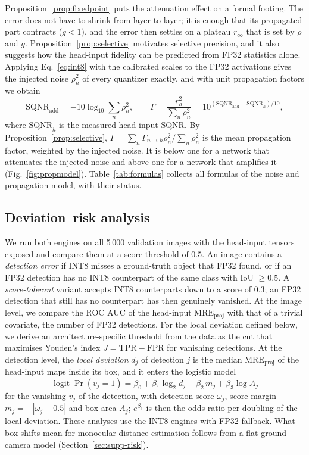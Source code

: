 \documentclass[pdflatex,sn-mathphys-num]{sn-jnl}%
\theoremstyle{thmstyleone}%
\theoremstyle{thmstyletwo}%
\theoremstyle{thmstylethree}%
\begin{document}
Proposition~\ref{prop:fixedpoint} puts the attenuation effect on a formal footing. The error does not have to shrink from layer to layer; it is enough that its propagated part contracts ($g<1$), and the error then settles on a plateau $r_\infty$ that is set by $\rho$ and $g$. Proposition~\ref{prop:selective} motivates selective precision, and it also suggests how the head-input fidelity can be predicted from FP32 statistics alone. Applying Eq.~\eqref{eq:int8} with the calibrated scales to the FP32 activations gives the injected noise $\rho_n^2$ of every quantizer exactly, and with unit propagation factors we obtain
\begin{equation}
\mathrm{SQNR}_\mathrm{add}=-10\log_{10}\sum_n\rho_n^2,\qquad\bar\Gamma=\frac{r_h^2}{\sum_n\rho_n^2}=10^{(\mathrm{SQNR}_\mathrm{add}-\mathrm{SQNR}_h)/10},\label{eq:gammabar}
\end{equation}
where $\mathrm{SQNR}_h$ is the measured head-input SQNR. By Proposition~\ref{prop:selective}, $\bar\Gamma=\sum_n\Gamma_{n\to h}\rho_n^2/\sum_n\rho_n^2$ is the mean propagation factor, weighted by the injected noise. It is below one for a network that attenuates the injected noise and above one for a network that amplifies it (Fig.~\ref{fig:propmodel}). Table~\ref{tab:formulas} collects all formulas of the noise and propagation model, with their status.

\subsection{Deviation--risk analysis}\label{sec:risk}

We run both engines on all 5\,000 validation images with the head-input tensors exposed and compare them at a score threshold of 0.5. An image contains a \emph{detection error} if INT8 misses a ground-truth object that FP32 found, or if an FP32 detection has no INT8 counterpart of the same class with IoU $\geq0.5$. A \emph{score-tolerant} variant accepts INT8 counterparts down to a score of 0.3; an FP32 detection that still has no counterpart has then genuinely vanished. At the image level, we compare the ROC AUC of the head-input $\mathrm{MRE}_\mathrm{proj}$ with that of a trivial covariate, the number of FP32 detections. For the local deviation defined below, we derive an architecture-specific threshold from the data as the cut that maximises Youden's index $J=\mathrm{TPR}-\mathrm{FPR}$ for vanishing detections. At the detection level, the \emph{local deviation} $d_j$ of detection $j$ is the median $\mathrm{MRE}_\mathrm{proj}$ of the head-input maps inside its box, and it enters the logistic model
\begin{equation}
\operatorname{logit}\Pr(v_j=1)=\beta_0+\beta_1\log_2 d_j+\beta_2\,m_j+\beta_3\log A_j\label{eq:logit}
\end{equation}
for the vanishing $v_j$ of the detection, with detection score $\omega_j$, score margin $m_j=-|\omega_j-0.5|$ and box area $A_j$; $e^{\beta_1}$ is then the odds ratio per doubling of the local deviation. These analyses use the INT8 engines with FP32 fallback. What box shifts mean for monocular distance estimation follows from a flat-ground camera model (Section~\ref{sec:supp-risk}).
\end{document}
